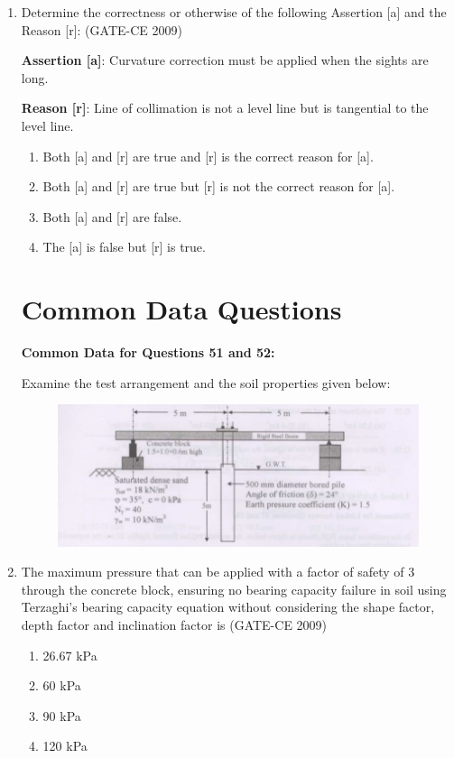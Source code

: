 \documentclass[journal,12pt,onecolumn]{article}
\theoremstyle{remark}
\begin{document}
\begin{enumerate}
    \item Determine the correctness or otherwise of the following Assertion [a] and the Reason [r]: (GATE-CE 2009)

    \textbf{Assertion [a]}: Curvature correction must be applied when the sights are long.

    \textbf{Reason [r]}: Line of collimation is not a level line but is tangential to the level line.
    \begin{enumerate}
        \item Both [a] and [r] are true and [r] is the correct reason for [a].
        \item Both [a] and [r] are true but [r] is not the correct reason for [a].
        \item Both [a] and [r] are false.
        \item The [a] is false but [r] is true.
    \end{enumerate}

\section*{Common Data Questions}
\textbf{Common Data for Questions 51 and 52:}

Examine the test arrangement and the soil properties given below:
\begin{figure}[H]
    \centering
    \includegraphics[width=0.7\columnwidth]{figs/image5.jpg}
    \caption{}
    \label{fig:placeholder}
    \end{figure}

    \item The maximum pressure that can be applied with a factor of safety of 3 through the concrete block, ensuring no bearing capacity failure in soil using Terzaghi's bearing capacity equation without considering the shape factor, depth factor and inclination factor is (GATE-CE 2009)
    \begin{enumerate}
        \item 26.67 kPa 
        \item 60 kPa 
        \item 90 kPa 
        \item 120 kPa
    \end{enumerate}
    

\end{enumerate}
\end{document}
